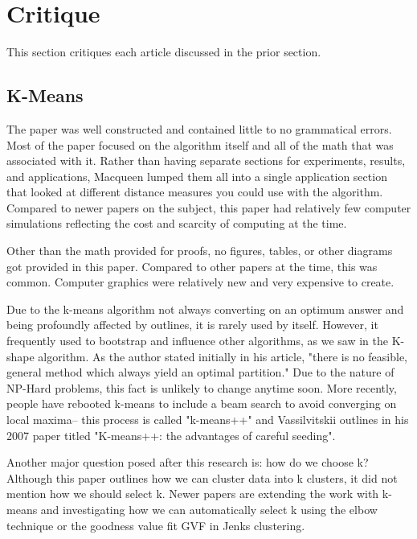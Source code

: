 \documentclass[12pt]{apa6}
\begin{document}
\section{Critique}

This section critiques each article discussed in the prior section.

\subsection{K-Means}


The paper was well constructed and contained little to no grammatical errors. Most of the paper focused on the algorithm itself and all of the math that was associated with it. Rather than having separate sections for experiments, results, and applications, Macqueen lumped them all into a single application section that looked at different distance measures you could use with the algorithm. Compared to newer papers on the subject, this paper had relatively few computer simulations reflecting the cost and scarcity of computing at the time. 

Other than the math provided for proofs, no figures, tables, or other diagrams got provided in this paper. Compared to other papers at the time, this was common. Computer graphics were relatively new and very expensive to create.

Due to the k-means algorithm not always converting on an optimum answer and being profoundly affected by outlines, it is rarely used by itself. However, it frequently used to bootstrap and influence other algorithms, as we saw in the K-shape algorithm. 
As the author stated initially in his article, "there is no feasible, general method which always yield an optimal partition." Due to the nature of NP-Hard problems, this fact is unlikely to change anytime soon. More recently, people have rebooted k-means to include a beam search to avoid converging on local maxima-- this process is called "k-means++" and Vassilvitskii outlines in his  2007 paper titled "K-means++: the advantages of careful seeding"\cite{kplus}.

Another major question posed after this research is: how do we choose k? Although this paper outlines how we can cluster data into k clusters, it did not mention how we should select k. Newer papers are extending the work with k-means and investigating how we can automatically select k using the elbow technique or the goodness value fit GVF in Jenks clustering.
\end{document}

